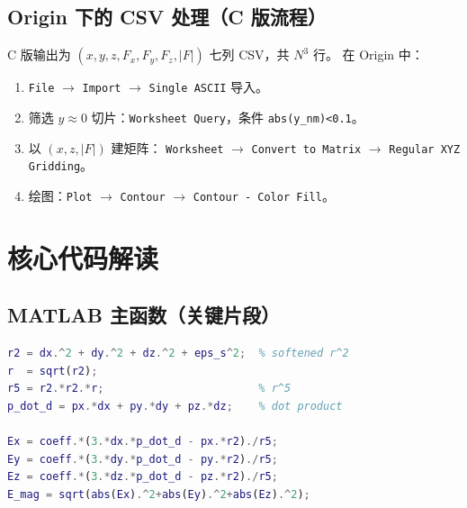 \documentclass[11pt,a4paper]{article}
\begin{document}
\subsection{Origin 下的 CSV 处理（C 版流程）}
C 版输出为 $(x,y,z,F_{x},F_{y},F_{z},|F|)$ 七列 CSV，共 $N^{3}$ 行。
在 Origin 中：
\begin{enumerate}
    \item \texttt{File} \(\rightarrow\) \texttt{Import} \(\rightarrow\) \texttt{Single ASCII}
          导入。
    \item 筛选 $y\approx 0$ 切片：\texttt{Worksheet Query}，条件
          \texttt{abs(y\_nm)<0.1}。
    \item 以 $(x,z,|F|)$ 建矩阵：
          \texttt{Worksheet} \(\rightarrow\) \texttt{Convert to Matrix} \(\rightarrow\)
          \texttt{Regular XYZ Gridding}。
    \item 绘图：\texttt{Plot} \(\rightarrow\) \texttt{Contour} \(\rightarrow\)
          \texttt{Contour - Color Fill}。
\end{enumerate}

\section{核心代码解读}

\subsection{MATLAB 主函数（关键片段）}
\begin{lstlisting}[language=Matlab,caption={electric\_dipole\_field.m 计算内核}]
r2 = dx.^2 + dy.^2 + dz.^2 + eps_s^2;  % softened r^2
r  = sqrt(r2);
r5 = r2.*r2.*r;                        % r^5
p_dot_d = px.*dx + py.*dy + pz.*dz;    % dot product

Ex = coeff.*(3.*dx.*p_dot_d - px.*r2)./r5;
Ey = coeff.*(3.*dy.*p_dot_d - py.*r2)./r5;
Ez = coeff.*(3.*dz.*p_dot_d - pz.*r2)./r5;
E_mag = sqrt(abs(Ex).^2+abs(Ey).^2+abs(Ez).^2);
\end{lstlisting}
\end{document}
